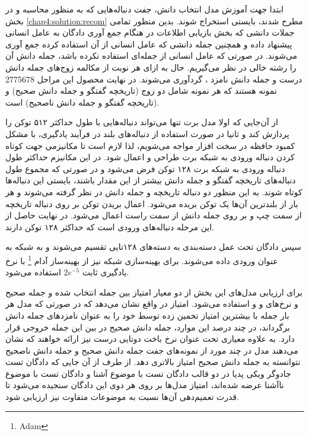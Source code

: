  ابتدا جهت آموزش مدل انتخاب دانش،‌ جفت دنباله‌هایی که به منظور محاسبه 
 و
 در بخش 
 \ref{chap4:solution:recom}
 مطرح شدند، بایستی استخراج شوند. بدین منظور تمامی جملات دانشی که بخش بازیابی اطلاعات در هنگام جمع آوری دادگان به عامل انسانی پیشنهاد داده و همچنین جمله دانشی که عامل انسانی از آن استفاده کرده جمع آوری می‌شوند. در صورتی که عامل انسانی از جمله‌ای استفاده نکرده باشد،‌ جمله دانش آن را رشته خالی در نظر می‌گیریم. حال به ازای هر نوبت از مکالمه زوج‌های جمله دانش درست و جمله دانش نامزد ، گردآوری می‌شوند. در نهایت محصول این مراحل 2775678 نمونه هستند که هر نمونه شامل دو زوج (تاریخچه گفتگو و جمله دانش صحیح) و (تاریخچه گفتگو و جمله دانش ناصحیح) است. 
 

از آن‌جایی که اولا مدل برت تنها می‌تواند دنباله‌هایی با طول حداکثر ۵۱۲ توکن را پردازش کند و ثانیا در صورت استفاده از دنباله‌های بلند در فرآیند یادگیری، با مشکل کمبود حافظه در سخت افزار مواجه می‌شویم، لذا لازم است تا مکانیزمی جهت کوتاه کردن دنباله ورودی به شبکه برت طراحی و اعمال شود. در این مکانیزم حداکثر طول دنباله ورودی به شبکه برت ۱۲۸ توکن فرض می‌شود و در صورتی که مجموع طول دنباله‌های تاریخچه گفتگو و جمله دانش بیشتر از این مقدار باشند، بایستی این دنباله‌ها کوتاه شوند. به این منظور دو دنباله تاریخچه و جمله دانش در نظر گرفته می‌شوند و هر بار از بلندترین آن‌ها یک توکن بریده می‌شود. اعمال بریدن توکن بر روی دنباله تاریخچه از سمت چپ و بر روی جمله دانش از سمت راست اعمال می‌شود. در نهایت حاصل از این مرحله دنباله‌های ورودی است که حداکثر ۱۲۸ توکن دارند. 

سپس دادگان تحت عمل دسته‌بندی به دسته‌های ۱۲۸تایی تقسیم می‌شوند و به شبکه به عنوان ورودی داده می‌شوند. برای بهینه‌سازی شبکه نیز از بهینه‌ساز آدام
\footnote{Adam}
با نرخ یادگیری ثابت 
$2e^{-5}$
استفاده می‌شود.

برای ارزیابی مدل‌های این بخش از دو معیار امتیاز
بین جمله انتخاب شده و جمله صحیح
و نرخ‌های 
 و  و 
استفاده می‌شود. امتیاز
در واقع نشان می‌دهد که در صورتی که مدل هر بار 
جمله  با بیشترین امتیاز تخمین زده توسط خود را به عنوان نامزد‌های جمله دانش برگرداند، در چند درصد این موارد، جمله دانش صحیح در بین این 
جمله خروجی قرار دارد. 
به علاوه معیاری تحت عنوان نرخ باخت دوتایی درست نیز ارائه خواهند که نشان می‌دهند مدل در چند مورد از نمونه‌های جفت جمله دانش صحیح و جمله دانش ناصحیح نتوانسته به جمله دانش صحیح امتیاز بالاتری دهد. 
از طرف از آن‌ جایی که دادگان تست جادوگر ویکی پدیا در دو قالب دادگان تست با موضوع آشنا و دادگان تست با موضوع ناآشنا عرضه شده‌اند، امتیاز مدل‌ها بر روی هر دوی این دادگان سنجیده می‌شود تا قدرت تعمیم‌دهی آن‌ها نسبت به موضوعات متفاوت نیز ارزیابی شود.  

